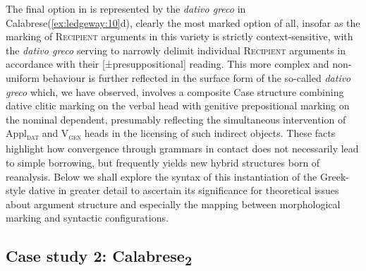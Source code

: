 \documentclass[output=paper,modfonts,nonflat,colorlinks,citecolor=brown]{langsci/langscibook}
\begin{document}
The final option in  is represented by the \textit{dativo greco} in Calabrese(\ref{ex:ledgeway:10}d), clearly the most marked option of all, insofar as the marking of \textsc{Recipient} arguments in this variety is strictly context-sensitive, with the \textit{dativo greco} serving to narrowly delimit individual \textsc{Recipient} arguments in accordance with their [±presuppositional] reading. This more complex and non-uniform behaviour is further reflected in the surface form of the so-called \textit{dativo greco} which, we have observed, involves a composite Case structure combining dative clitic marking on the verbal head with genitive prepositional marking on the nominal dependent, presumably reflecting the simultaneous intervention of Appl\textsc{\textsubscript{dat}} and V\textsc{\textsubscript{gen}} heads in the licensing of such indirect objects. These facts highlight how convergence through grammars in contact does not necessarily lead to simple borrowing, but frequently yields new hybrid structures born of reanalysis. Below we shall explore the syntax of this instantiation of the Greek-style dative in greater detail to ascertain its significance for theoretical issues about argument structure and especially the mapping between morphological marking and syntactic configurations.
 

 
\subsection{Case study 2: Calabrese\textsubscript{2}}
\end{document}
